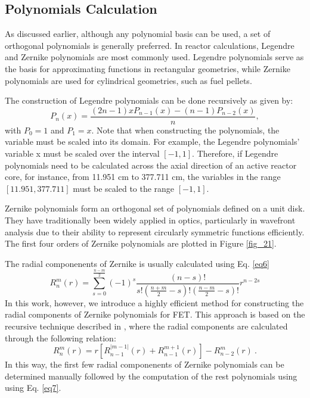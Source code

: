 \subsection{Polynomials Calculation} \label{sec22}

As discussed earlier, although any polynomial basis can be used, a set of orthogonal polynomials is generally preferred. In reactor calculations, Legendre and Zernike polynomials are most commonly used. Legendre polynomials serve as the basis for approximating functions in rectangular geometries, while Zernike polynomials are used for cylindrical geometries, such as fuel pellets.

The construction of Legendre polynomials can be done recursively as given by:
\begin{equation}
    P_n\left(x\right)=\frac{\left(2n-1\right)xP_{n-1}\left(x\right)-\left(n-1\right)P_{n-2}\left(x\right)}{n},
\end{equation}
with $P_0=1$ and $P_1=x$. Note that when constructing the polynomials, the variable must be scaled into its domain. For example, the Legendre polynomials' variable x must be scaled over the interval $[-1, 1]$. Therefore, if Legendre polynomials need to be calculated across the axial direction of an active reactor core, for instance, from 11.951 cm to 377.711 cm, the variables in the range $[11.951, 377.711]$ must be scaled to the range $[-1, 1]$.

Zernike polynomials form an orthogonal set of polynomials defined on a unit disk. They have traditionally been widely applied in optics, particularly in wavefront analysis due to their ability to represent circularly symmetric functions efficiently. The first four orders of Zernike polynomials are plotted in Figure \ref{fig_21}.

The radial componenents of Zernike is usually calculated using Eq. \ref{eq6}
\begin{equation}
R_n^m(r) = \sum_{s=0}^{\frac{n-m}{2}} (-1)^s \frac{(n-s)!}{s! \left( \frac{n+m}{2} - s \right)! \left( \frac{n-m}{2} - s \right)!} r^{n-2s}
\label{eq6}
\end{equation}
In this work, however, we introduce a highly efficient method for constructing the radial components of Zernike polynomials for FET. This approach is based on the recursive technique described in \cite{honarvar}, where the radial components are calculated through the following relation:
\begin{equation}
    R_n^m\left(r\right)=r\left[R_{n-1}^{\left|m-1\right|}\left(r\right)+R_{n-1}^{m+1}\left(r\right)\right]-R_{n-2}^m\left(r\right)\ .
    \label{eq7}
\end{equation}
In this way, the first few radial componenents of Zernike polynomials can be determined manually followed by the computation of the rest polynomials using using Eq. \ref{eq7}.

